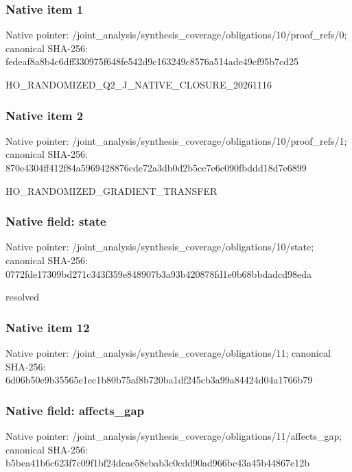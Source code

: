 \documentclass[10pt,a4paper]{article}
\begin{document}
\subsubsection{Native item 1}
Native pointer: /joint\_\allowbreak{}analysis/synthesis\_\allowbreak{}coverage/obligations/10/proof\_\allowbreak{}refs/0; canonical SHA-256: fedeaf8a8b4c6dff330975f648fe542d9c163249c8576a514ade49cf95b7cd25

\begingroup\raggedright\sloppy HO\_\allowbreak{}RANDOMIZED\_\allowbreak{}Q2\_\allowbreak{}J\_\allowbreak{}NATIVE\_\allowbreak{}CLOSURE\_\allowbreak{}20261116\par\endgroup

\subsubsection{Native item 2}
Native pointer: /joint\_\allowbreak{}analysis/synthesis\_\allowbreak{}coverage/obligations/10/proof\_\allowbreak{}refs/1; canonical SHA-256: 870e4304ff412f84a5969428876cde72a3db0d2b5cc7e6c090fbddd18d7e6899

\begingroup\raggedright\sloppy HO\_\allowbreak{}RANDOMIZED\_\allowbreak{}GRADIENT\_\allowbreak{}TRANSFER\par\endgroup

\subsubsection{Native field: state}
Native pointer: /joint\_\allowbreak{}analysis/synthesis\_\allowbreak{}coverage/obligations/10/state; canonical SHA-256: 0772fde17309bd271c343f359e848907b3a93b420878fd1e0b68bbdadcd98eda

\begingroup\raggedright\sloppy resolved\par\endgroup

\subsubsection{Native item 12}
Native pointer: /joint\_\allowbreak{}analysis/synthesis\_\allowbreak{}coverage/obligations/11; canonical SHA-256: 6d06b50e9b35565e1ec1b80b75af8b720ba1df245cb3a99a84424d04a1766b79

\subsubsection{Native field: affects\_\allowbreak{}gap}
Native pointer: /joint\_\allowbreak{}analysis/synthesis\_\allowbreak{}coverage/obligations/11/affects\_\allowbreak{}gap; canonical SHA-256: b5bea41b6c623f7c09f1bf24dcae58ebab3c0cdd90ad966bc43a45b44867e12b
\end{document}
